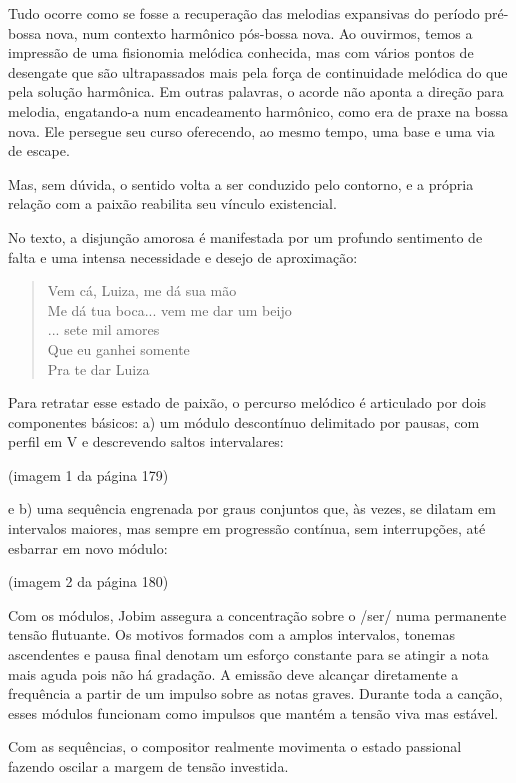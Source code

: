 Tudo ocorre como se fosse a recuperação das melodias expansivas do
período pré-bossa nova, num contexto harmônico pós-bossa nova. Ao
ouvirmos, temos a impressão de uma fisionomia melódica conhecida, mas
com vários pontos de desengate que são ultrapassados mais pela força de
continuidade melódica do que pela solução harmônica. Em outras palavras,
o acorde não aponta a direção para melodia, engatando-a num encadeamento
harmônico, como era de praxe na bossa nova. Ele persegue seu curso
oferecendo, ao mesmo tempo, uma base e uma via de escape.~

Mas, sem dúvida, o sentido volta a ser conduzido pelo contorno, e a
própria relação com a paixão reabilita seu vínculo existencial.

No texto, a disjunção amorosa é manifestada por um profundo sentimento
de falta e uma intensa necessidade e desejo de aproximação:

\begin{verse}
Vem cá, Luiza, me dá sua mão\\
Me dá tua boca... vem me dar um beijo\\
... sete mil amores\\
Que eu ganhei somente\\
Pra te dar Luiza
\end{verse}

Para retratar esse estado de paixão, o percurso melódico é articulado
por dois componentes básicos: a) um módulo descontínuo delimitado por
pausas, com perfil em V e descrevendo saltos intervalares:

(imagem 1 da página 179)

e b) uma sequência engrenada por graus conjuntos que, às vezes, se
dilatam em intervalos maiores, mas sempre em progressão contínua, sem
interrupções, até esbarrar em novo módulo:~

(imagem 2 da página 180)

Com os módulos, Jobim assegura a concentração sobre o /ser/ numa
permanente tensão flutuante. Os motivos formados com a amplos
intervalos, tonemas ascendentes e pausa final denotam um esforço
constante para se atingir a nota mais aguda pois não há gradação. A
emissão deve alcançar diretamente a frequência a partir de um impulso
sobre as notas graves. Durante toda a canção, esses módulos funcionam
como impulsos que mantém a tensão viva mas estável.

Com as sequências, o compositor realmente movimenta o estado passional
fazendo oscilar a margem de tensão investida.~

